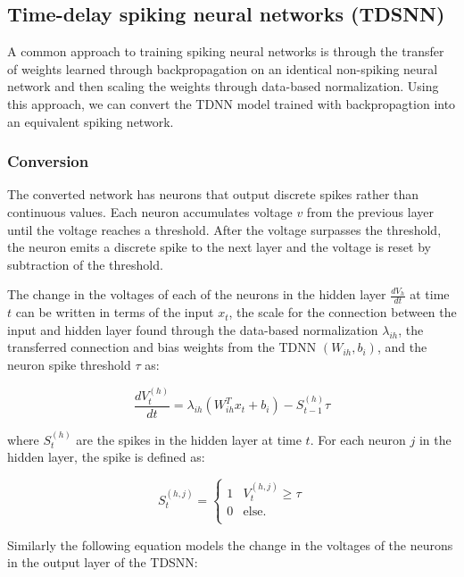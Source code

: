 \documentclass{article}
\begin{document}
\subsection*{Time-delay spiking neural networks (TDSNN)}

A common approach to training spiking neural networks is through the transfer of weights learned through backpropagation on an identical non-spiking neural network and then scaling the weights through data-based normalization. Using this approach, we can convert the TDNN model trained with backpropagtion into an equivalent spiking network. \cite{rueckauer2017conversion}

\subsubsection*{Conversion}
The converted network has neurons that output discrete spikes rather than continuous values. Each neuron accumulates voltage $v$ from the previous layer until the voltage reaches a threshold. After the voltage surpasses the threshold, the neuron emits a discrete spike to the next layer and the voltage is reset by subtraction of the threshold. \cite{diehl2015fast} 

The change in the voltages of each of the neurons in the hidden layer $\frac{dV_h}{dt}$ at time $t$ can be written in terms of the input $x_t$, the scale for the connection between the input and hidden layer found through the data-based normalization $\lambda_{ih}$, the transferred connection and bias weights from the TDNN $\left(W_{ih}, b_{i}\right)$, and the neuron spike threshold $\tau$ as:

\begin{equation}
    \frac{dV^{\left(h\right)}_t}{dt} = \lambda_{ih}\left(W_{ih}^Tx_t + b_i\right) - S^{\left(h\right)}_{t-1}\tau
\end{equation}

where $S^{\left(h\right)}_{t}$ are the spikes in the hidden layer at time $t$. For each neuron $j$ in the hidden layer, the spike is defined as:

\begin{equation}
    S^{\left(h,j\right)}_{t} = \begin{cases} 1 & V^{\left(h,j\right)}_{t}\geq \tau \\
      0 & \text{else.} \\ \end{cases}
\end{equation}

Similarly the following equation models the change in the voltages of the neurons in the output layer of the TDSNN:
\end{document}
